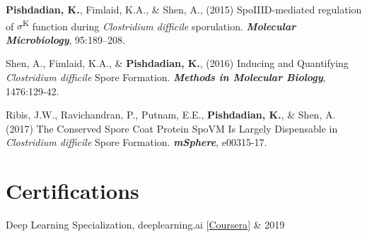 \documentclass[letterpaper,hidelinks]{scrartcl}
\begin{document}
\begin{list1}
\item \textbf{Pishdadian, K.}, Fimlaid, K.A., \& Shen, A., (2015) SpoIIID-mediated regulation of $\sigma$\textsuperscript{K} function during \emph{Clostridium difficile} sporulation. \textbf{\emph{Molecular Microbiology}}, 95:189--208.
\item Shen, A., Fimlaid, K.A., \& \textbf{Pishdadian, K.}, (2016) Inducing and Quantifying \emph{Clostridium difficile} Spore Formation. \textbf{\emph{Methods in Molecular Biology}}, 1476:129-42.
\item Ribis, J.W., Ravichandran, P., Putnam, E.E., \textbf{Pishdadian, K.}, \& Shen, A. (2017) The Conserved Spore Coat Protein SpoVM Is Largely Dispensable in \emph{Clostridium difficile} Spore Formation. \textbf{\emph{mSphere}}, e00315-17.
\end{list1}

%
%

\section*{Certifications}
\begin{list1}
\item\begin{tabular1bold}Deep Learning Specialization, deeplearning.ai [\href{https://www.coursera.org/account/accomplishments/specialization/MEYXXF6FHDAE}{Coursera}] & 2019\end{tabular1bold}
\end{list1}
\end{document}
